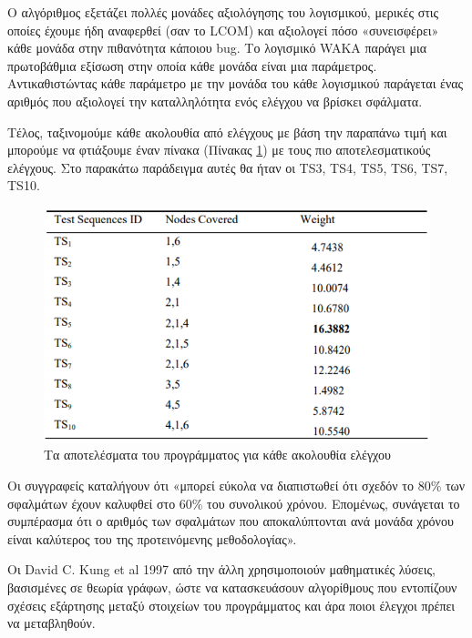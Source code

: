 \documentclass[12pt]{article}
\begin{document}
\par Ο αλγόριθμος εξετάζει πολλές μονάδες αξιολόγησης του λογισμικού, μερικές στις οποίες έχουμε ήδη αναφερθεί (σαν το LCOM) και αξιολογεί πόσο «συνεισφέρει» κάθε μονάδα στην πιθανότητα κάποιου bug. Το λογισμικό WAKA παράγει μια πρωτοβάθμια εξίσωση στην οποία κάθε μονάδα είναι μια παράμετρος. Αντικαθιστώντας κάθε παράμετρο με την μονάδα του κάθε λογισμικού παράγεται ένας αριθμός που αξιολογεί την καταλληλότητα ενός ελέγχου να βρίσκει σφάλματα. 

\par Τέλος, ταξινομούμε κάθε ακολουθία από ελέγχους με βάση την παραπάνω τιμή και μπορούμε να φτιάξουμε έναν πίνακα (Πίνακας \ref{fig:test_table}) με τους πιο αποτελεσματικούς ελέγχους. Στο παρακάτω παράδειγμα αυτές θα ήταν οι TS3, TS4, TS5, TS6, TS7, TS10.

\begin{figure}
\label{fig:test_table}
\caption{Τα αποτελέσματα του προγράμματος για κάθε ακολουθία ελέγχου}
\includegraphics[width=\textwidth,height=\textheight,keepaspectratio]{test_table.PNG}
\end{figure}
 
\par Οι συγγραφείς καταλήγουν ότι «μπορεί εύκολα να διαπιστωθεί ότι σχεδόν το 80\% των σφαλμάτων έχουν καλυφθεί στο 60\% του συνολικού χρόνου. Επομένως, συνάγεται το συμπέρασμα ότι ο αριθμός των σφαλμάτων που αποκαλύπτονται ανά μονάδα χρόνου είναι καλύτερος του της προτεινόμενης μεθοδολογίας».

\par Οι David C. Kung et al 1997 από την άλλη χρησιμοποιούν μαθηματικές λύσεις, βασισμένες σε θεωρία γράφων, ώστε να κατασκευάσουν αλγορίθμους που εντοπίζουν σχέσεις εξάρτησης μεταξύ στοιχείων του προγράμματος και άρα ποιοι έλεγχοι πρέπει να μεταβληθούν.
\end{document}
